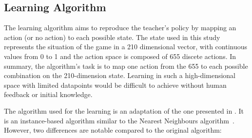 

\subsection{Learning Algorithm} \label{sec:tuto_algo}
The learning algorithm aims to reproduce the teacher's policy by mapping an action (or no action) to each possible state. The state used in this study represents the situation of the game in a 210 dimensional vector, with continuous values from 0 to 1 and the action space is composed of 655 discete actions. In summary, the algorithm's task is to map one action from the 655 to each possible combination on the 210-dimension state. Learning in such a high-dimensional space with limited datapoints would be difficult to achieve without human feedback or initial knowledge.

The algorithm used for the learning is an adaptation of the one presented in \cite{senft2017toward}. It is an instance-based algorithm similar to the Nearest Neighbours algorithm~\citep{cover1967nearest}. However, two differences are notable compared to the original algorithm: %

